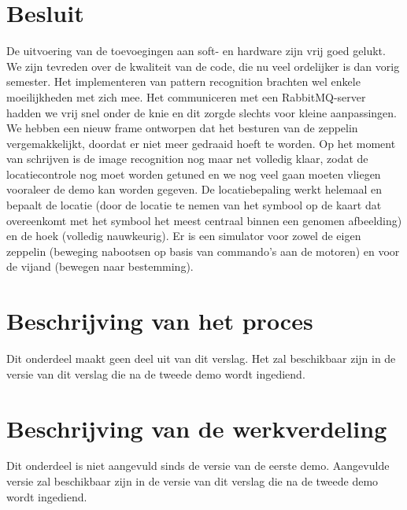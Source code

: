 \documentclass[eind]{penoverslag}
\begin{document}
\section{Besluit}
De uitvoering van de toevoegingen aan soft- en hardware zijn vrij goed gelukt. We zijn tevreden over de kwaliteit van de code, die nu veel ordelijker is dan vorig semester. Het implementeren van pattern recognition brachten wel enkele moeilijkheden met zich mee. Het communiceren met een RabbitMQ-server hadden we vrij snel onder de knie en dit zorgde slechts  voor kleine aanpassingen. We hebben een nieuw frame ontworpen dat het besturen van de zeppelin vergemakkelijkt, doordat er niet meer gedraaid hoeft te worden. Op het moment van schrijven is de image recognition nog maar net volledig klaar, zodat de locatiecontrole nog moet worden getuned en we nog veel gaan moeten vliegen vooraleer de demo kan worden gegeven. De locatiebepaling werkt helemaal en bepaalt de locatie (door de locatie te nemen van het symbool op de kaart dat overeenkomt met het symbool het meest centraal binnen een genomen afbeelding) en de hoek (volledig nauwkeurig). Er is een simulator voor zowel de eigen zeppelin (beweging nabootsen op basis van commando's aan de motoren) en voor de vijand (bewegen naar bestemming).



\newpage\makeappendix

\section{Beschrijving van het proces}
Dit onderdeel maakt geen deel uit van dit verslag. Het zal beschikbaar zijn in de versie van dit verslag die na de tweede demo wordt ingediend.


\section{Beschrijving van de werkverdeling}
Dit onderdeel is niet aangevuld sinds de versie van de eerste demo. Aangevulde versie zal beschikbaar zijn in de versie van dit verslag die na de tweede demo wordt ingediend.
\end{document}
